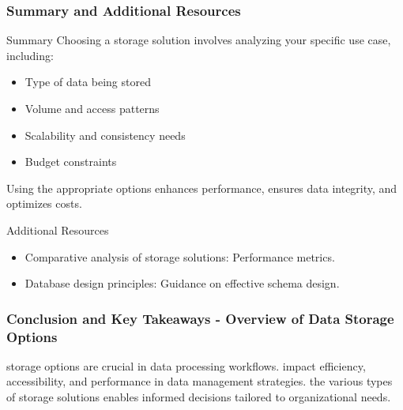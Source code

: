 \documentclass[aspectratio=169]{beamer}
\begin{document}
\begin{frame}[fragile]
    \frametitle{Summary and Additional Resources}
    \begin{block}{Summary}
        Choosing a storage solution involves analyzing your specific use case, including:
        \begin{itemize}
            \item Type of data being stored
            \item Volume and access patterns
            \item Scalability and consistency needs
            \item Budget constraints
        \end{itemize}
        Using the appropriate options enhances performance, ensures data integrity, and optimizes costs.
    \end{block}
    \begin{block}{Additional Resources}
        \begin{itemize}
            \item Comparative analysis of storage solutions: Performance metrics.
            \item Database design principles: Guidance on effective schema design.
        \end{itemize}
    \end{block}
\end{frame}

\begin{frame}[fragile]
    \frametitle{Conclusion and Key Takeaways - Overview of Data Storage Options}
    \begin{itemize}
        \itemData storage options are crucial in data processing workflows.
        \itemThey impact efficiency, accessibility, and performance in data management strategies.
        \itemUnderstanding the various types of storage solutions enables informed decisions tailored to organizational needs.
    \end{itemize}
\end{frame}
\end{document}

